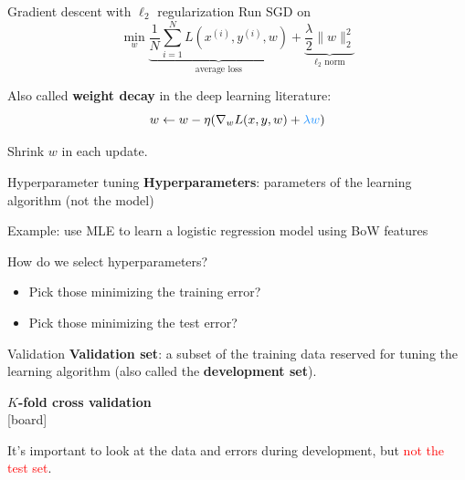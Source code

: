 \documentclass[usenames,dvipsnames,notes,11pt,aspectratio=169]{beamer}
\newcommand{\pdfnote}[1]{}
\begin{document}
\begin{frame}
    {Gradient descent with $\ell_2$ regularization}
    Run SGD on 
    $$
    \min_w \underbrace{\frac{1}{N}\sum_{i=1}^N L(x^{(i)}, y^{(i)}, w)}_{\text{average loss}}
    + \underbrace{\frac{\lambda}{2}\|w\|_2^2}_{\ell_2 \text{ norm}}
    $$

    Also called \textbf{weight decay} in the deep learning literature:
    $$
    w \leftarrow w - \eta(\nabla_w L(x, y, w) + {\color{blue}\lambda w})
    $$

    Shrink $w$ in each update.
\end{frame}

\begin{frame}
    {Hyperparameter tuning}
    \textbf{Hyperparameters}: parameters of the learning algorithm (not the model)

    Example: use MLE to learn a logistic regression model using BoW features \\
    \bigskip
    \pause

    \pause
    How do we select hyperparameters?\\
    \begin{itemize}
        \item[] Pick those minimizing the training error?
        \item[] Pick those minimizing the test error?
    \end{itemize}
    \pdfnote{What are the hyperparams in this case?}
    \pdfnote{
        Dillema: training error overfit. test error don't know.
    }
\end{frame}

\begin{frame}
    {Validation}
    \textbf{Validation set}: a subset of the training data reserved for tuning the learning algorithm (also called the \textbf{development set}).

    \textbf{$K$-fold cross validation}\\
    {[board]}

    \pause
    It's important to look at the data and errors during development, but \textcolor{red}{not the test set}.
\end{frame}
\end{document}
